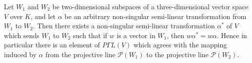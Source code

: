 Let $W_1$ and $W_2$ be two-dimensional subspaces of a three-dimensional vector space $V$ over $K$, and let $\alpha$ be an arbitrary non-singular semi-linear transformation from $W_1$ to $W_2$. Then there exists a non-singular semi-linear transformation $\alpha^*$ of $V$ which sends $W_1$ to $W_2$ such that if $w$ is a vector in $W_1$, then $w\alpha^* = w\alpha$. Hence in particular there is an element of $P\Gamma L(V)$ which agrees with the mapping induced by $\alpha$ from the projective line $\mathcal{P}(W_1)$ to the projective line $\mathcal{P}(W_2)$.
